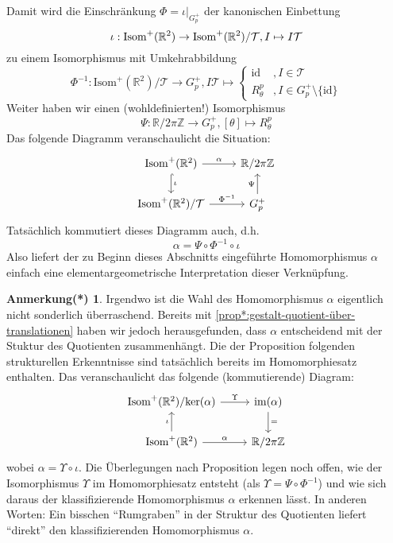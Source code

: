 \documentclass[a4paper, ngerman]{article}
\newcounter{chapter}
\numberwithin{equation}{chapter}
\theoremstyle{plain}
\theoremstyle{definition}
\newtheorem{annotationstrd}{Anmerkung(*)}[chapter]
\newcommand{\id}{\ensuremath{\text{id}}}
\newcommand{\geradisometr}{\ensuremath{\mathrm{Isom}^+(\mathbb R^2)}}
\begin{document}
Damit wird die Einschränkung \(\Phi = \iota|_{G_p^+}\) der kanonischen Einbettung
\begin{equation*}
    \iota: \geradisometr \break \to \geradisometr/\mathcal T, I \mapsto I\mathcal T
\end{equation*}
zu einem Isomorphismus mit Umkehrabbildung 
\begin{equation*}
    \Phi^{-1}: \geradisometr/\mathcal T \to G_p^+, I\mathcal T \mapsto 
    \begin{cases}
        \id &, I \in \mathcal T \\
        R_\theta^p &, I \in G_p^+\setminus \{\id\}
    \end{cases}
\end{equation*}
Weiter haben wir einen (wohldefinierten!) Isomorphismus 
\begin{equation*}
    \Psi: \mathbb R/2\pi\mathbb Z \to G_p^+, [\theta] \mapsto R_\theta^p
\end{equation*}
Das folgende Diagramm veranschaulicht die Situation:
\begin{equation*}
    \begin{tikzcd}
        \geradisometr \arrow[hook]{d}{\iota} \arrow{r}{\alpha} & \mathbb R/2\pi\mathbb Z \\
        \geradisometr/\mathcal T \arrow{r}{\Phi^{-1}} & G_p^+ \arrow{u}{\Psi}
    \end{tikzcd}
\end{equation*}
Tatsächlich kommutiert dieses Diagramm auch, d.h. 
\begin{equation*}
    \alpha = \Psi\circ \Phi^{-1}\circ \iota
\end{equation*}
Also liefert der zu Beginn dieses Abschnitts eingeführte Homomorphismus \(\alpha\) einfach eine elementargeometrische Interpretation dieser Verknüpfung. 

\begin{annotationstrd}
    Irgendwo ist die Wahl des Homomorphismus \(\alpha\) eigentlich nicht sonderlich überraschend. Bereits mit \cref{prop*:gestalt-quotient-über-translationen} haben wir jedoch herausgefunden, dass \(\alpha\) entscheidend mit der Stuktur des Quotienten zusammenhängt. Die der Proposition folgenden strukturellen Erkenntnisse sind tatsächlich bereits im Homomorphiesatz enthalten. Das veranschaulicht das folgende (kommutierende) Diagram: 
    \begin{equation*}
        \begin{tikzcd} 
            \geradisometr/\mathrm{ker}(\alpha) \arrow{r}{\Upsilon} & \mathrm{im}(\alpha) \arrow{d}{=} \\ \geradisometr \arrow{u}{\iota} \arrow{r}{\alpha} & \mathbb R/2\pi\mathbb Z
        \end{tikzcd}
    \end{equation*}
    wobei \(\alpha = \Upsilon \circ \iota\). Die Überlegungen nach Proposition legen noch offen, wie der Isomorphismus \(\Upsilon\) im Homomorphiesatz entsteht (als \(\Upsilon = \Psi \circ \Phi^{-1}\)) und wie sich daraus der klassifizierende Homomorphismus \(\alpha\) erkennen lässt. In anderen Worten: Ein bisschen "`Rumgraben"' in der Struktur des Quotienten liefert "`direkt"' den klassifizierenden Homomorphismus \(\alpha\). 
\end{annotationstrd}
\end{document}
